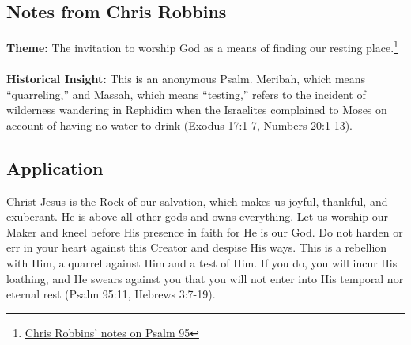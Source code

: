 \subsection{Notes from Chris Robbins}
\textbf{Theme: }The invitation to worship God as a means of finding our resting place.\footnote{\href{http://pastorchrisrobbins.blogspot.com/search?q=Psalm+95}{Chris Robbins' notes on Psalm 95} }\\
\\
\textbf{Historical Insight: }This is an anonymous Psalm. Meribah, which means “quarreling,” and Massah, which means “testing,” refers to the incident of wilderness wandering in Rephidim when the Israelites complained to Moses on account of having no water to drink (Exodus 17:1-7, Numbers 20:1-13).

\subsection*{Application} Christ Jesus is the Rock of our salvation, which makes us joyful, thankful, and exuberant. He is above all other gods and owns everything. Let us worship our Maker and kneel before His presence in faith for He is our God. Do not harden or err in your heart against this Creator and despise His ways. This is a rebellion with Him, a quarrel against Him and a test of Him. If you do, you will incur His loathing, and He swears against you that you will not enter into His temporal nor eternal rest (Psalm 95:11, Hebrews 3:7-19).